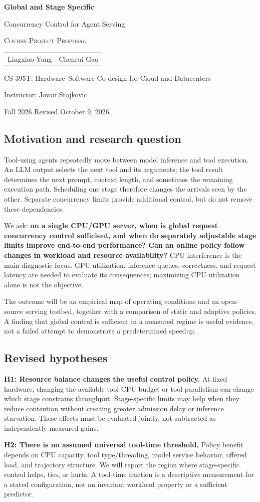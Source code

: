 \documentclass[10pt]{article}
\makeatletter
\newcommand{\makeproposalheader}{%
  \begin{center}
    \vspace*{-0.35in}
    {\LARGE\bfseries
      Global and Stage Specific\par
      \vspace{0.15em}
      Concurrency Control for Agent Serving\par}
    \vspace{0.8em}
    {\large\scshape Course Project Proposal\par}
    \vspace{1.15em}
    {\large
      \begin{tabular}{c@{\hspace{4.5em}}c}
        Lingxiao Yang & Chenrui Gao
      \end{tabular}\par}
    \vspace{0.8em}
    {CS 395T: Hardware--Software Co-design for Cloud and Datacenters\par}
    \vspace{0.15em}
    {Instructor: Jovan Stojkovic\par}
    \vspace{0.8em}
    {Fall 2026 \textperiodcentered{} Revised October 9, 2026\par}
  \end{center}
  \vspace{0.35em}
}
\makeatother
\begin{document}
\makeproposalheader
\hypertarget{motivation-and-research-question}{%
\subsection{Motivation and research
question}\label{motivation-and-research-question}}

Tool-using agents repeatedly move between model inference and tool
execution. An LLM output selects the next tool and its arguments; the
tool result determines the next prompt, context length, and sometimes
the remaining execution path. Scheduling one stage therefore changes the
arrivals seen by the other. Separate concurrency limits provide
additional control, but do not remove these dependencies.

We ask: \textbf{on a single CPU/GPU server, when is global request
concurrency control sufficient, and when do separately adjustable stage
limits improve end-to-end performance? Can an online policy follow
changes in workload and resource availability?} CPU interference is the
main diagnostic focus. GPU utilization, inference queues, correctness,
and request latency are needed to evaluate its consequences; maximizing
CPU utilization alone is not the objective.

The outcome will be an empirical map of operating conditions and an
open-source serving testbed, together with a comparison of static and
adaptive policies. A finding that global control is sufficient in a
measured regime is useful evidence, not a failed attempt to demonstrate
a predetermined speedup.

\hypertarget{revised-hypotheses}{%
\subsection{Revised hypotheses}\label{revised-hypotheses}}

\textbf{H1: Resource balance changes the useful control policy.} At
fixed hardware, changing the available tool CPU budget or tool
parallelism can change which stage constrains throughput. Stage-specific
limits may help when they reduce contention without creating greater
admission delay or inference starvation. These effects must be evaluated
jointly, not subtracted as independently measured gains.

\textbf{H2: There is no assumed universal tool-time threshold.} Policy
benefit depends on CPU capacity, tool type/threading, model service
behavior, offered load, and trajectory structure. We will report the
region where stage-specific control helps, ties, or hurts. A tool-time
fraction is a descriptive measurement for a stated configuration, not an
invariant workload property or a sufficient predictor.
\end{document}
